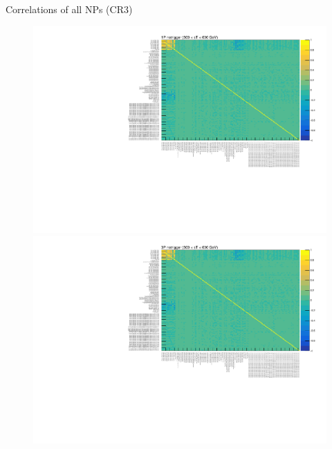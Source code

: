 \documentclass[aspectratio=46, dvipdfmx, 10pt, t]{beamer} %
\begin{document}
\begin{frame}{Correlations of all NPs (CR3)}
  \vspace{15mm}
  \begin{figure}
    \setcounter{subfigure}{0}
    \centering
        \includegraphics[scale=0.29]{correlation_1P_notrigger_CR3_stGE500LT600}
        \includegraphics[scale=0.29]{correlation_3P_notrigger_CR3_stGE500LT600}
  \end{figure}
\end{frame}
\end{document}
